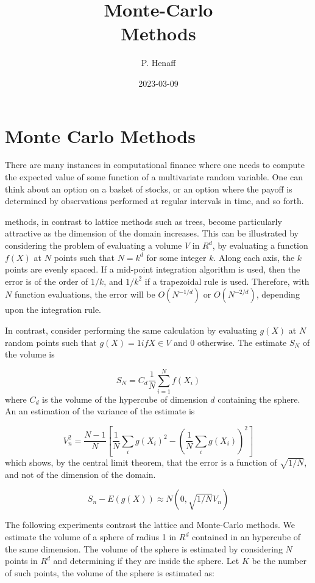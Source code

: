 \documentclass[12pt,]{tufte-book}
\title{Monte-Carlo\\
Methods}
\author{P. Henaff}
\date{2023-03-09}
\begin{document}
\maketitle



{
\setcounter{tocdepth}{0}
\tableofcontents
}

\hypertarget{monte-carlo-methods}{%
\chapter{Monte Carlo Methods}\label{monte-carlo-methods}}

There are many instances in computational finance where one needs to compute
the expected value of some function of a multivariate random variable. One can think about an option on a basket of stocks, or an option where the payoff is determined by observations performed at regular intervals in time, and so forth.

 methods, in contrast to lattice methods such as trees, become particularly attractive as the dimension of the domain increases. This can be illustrated by considering the problem of evaluating a volume \(V\) in \(R^d\), by evaluating a function \(f(X)\) at \(N\) points such that \(N = k^d\) for some integer \(k\).
Along each axis, the \(k\) points are evenly spaced. If a mid-point integration algorithm is used, then the error is of the order of \(1/k\), and \(1/k^2\) if a trapezoidal rule is used. Therefore, with \(N\) function evaluations, the error will be \(O(N^{-1/d})\) or \(O(N^{-2/d})\), depending upon the integration rule.

In contrast, consider performing the same calculation by evaluating \(g(X)\) at \(N\) random points such that \(g(X) = 1 if X \in V\) and \(0\) otherwise. The estimate \(S_N\) of the volume is

\[
S_N = C_d \frac{1}{N} \sum_{i=1}^N f(X_i)
\]
where \(C_d\) is the volume of the hypercube of dimension \(d\) containing the sphere. An an estimation of the variance of the estimate is

\[
V_n^2 = \frac{N-1}{N} \left[ \frac{1}{N} \sum_i g(X_i)^2 - \left(\frac{1}{N} \sum_i g(X_i)\right)^2 \right]
\]
which shows, by the central limit theorem, that the error is a function of \(\sqrt{1/N}\), and not of the dimension of the domain.

\[
S_n - E(g(X)) \approx N(0, \sqrt{1/N} V_n)
\]

The following experiments contrast the lattice and Monte-Carlo methods. We estimate the volume of a sphere of radius 1 in \(R^d\) contained in an hypercube of the same dimension. The volume of the sphere is estimated by considering \(N\) points in \(R^d\) and determining if they are inside the sphere. Let \(K\) be the number of such points, the volume of the sphere is estimated as:
\end{document}
